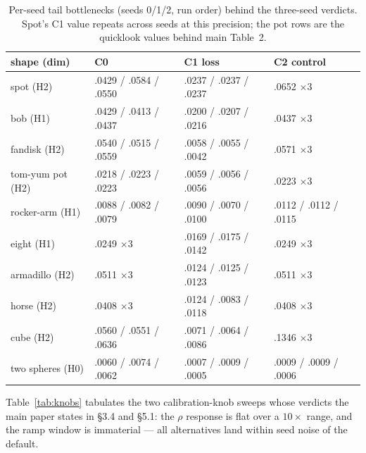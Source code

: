 \begin{table}[t]
\centering
\caption{Per-seed tail bottlenecks (seeds 0/1/2, run order) behind the
three-seed verdicts. Spot's C1 value repeats across seeds at this
precision; the pot rows are the quicklook values behind main
Table~2.}
\label{tab:perseed}
\footnotesize
\setlength{\tabcolsep}{4pt}
\begin{tabular}{llll}
\toprule
shape (dim) & C0 & C1 loss & C2 control \\
\midrule
spot (H2)    & .0429 / .0584 / .0550 & .0237 / .0237 / .0237 & .0652 $\times$3 \\
bob (H1)     & .0429 / .0413 / .0437 & .0200 / .0207 / .0216 & .0437 $\times$3 \\
fandisk (H2) & .0540 / .0515 / .0559 & .0058 / .0055 / .0042 & .0571 $\times$3 \\
tom-yum pot (H2) & .0218 / .0223 / .0223 & .0059 / .0056 / .0056 & .0223 $\times$3 \\
rocker-arm (H1) & .0088 / .0082 / .0079 & .0090 / .0070 / .0100 & .0112 / .0112 / .0115 \\
eight (H1)   & .0249 $\times$3 & .0169 / .0175 / .0142 & .0249 $\times$3 \\
armadillo (H2) & .0511 $\times$3 & .0124 / .0125 / .0123 & .0511 $\times$3 \\
horse (H2)   & .0408 $\times$3 & .0124 / .0083 / .0118 & .0408 $\times$3 \\
cube (H2)    & .0560 / .0551 / .0636 & .0071 / .0064 / .0086 & .1346 $\times$3 \\
two spheres (H0) & .0060 / .0074 / .0062 & .0007 / .0009 / .0005 & .0009 / .0009 / .0006 \\
\bottomrule
\end{tabular}
\end{table}

Table~\ref{tab:knobs} tabulates the two calibration-knob sweeps whose
verdicts the main paper states in \S 3.4 and \S 5.1: the $\rho$
response is flat over a $10\times$ range, and the ramp window is
immaterial --- all alternatives land within seed noise of the default.

